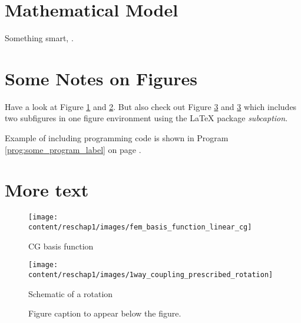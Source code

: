 \section{Mathematical Model}
Something smart, \cite{Gorman2006phd}.

\section{Some Notes on Figures}
Have a look at Figure \ref{fig:basis_fun_cg} and \ref{fig:rotation_schematic}. But also check out Figure \ref{fig:basis_functions} and \ref{fig:basis_functions} which includes two subfigures in one figure environment using the \LaTeX{} package \textsl{subcaption}.

Example of including programming code is shown in Program \ref{prog:some_program_label} on page \pageref{prog:some_program_label}.

\section{More text}
\blindtext

\begin{figure}[p]
 \centering
 \texttt{[image: content/reschap1/images/fem\_basis\_function\_linear\_cg]}
 \caption[Basis function]{CG basis function}
 \label{fig:basis_fun_cg}
\end{figure}

\begin{figure}[p]
 \centering
 \texttt{[image: content/reschap1/images/1way\_coupling\_prescribed\_rotation]}
 \caption[Schematic]{Schematic of a rotation}
 \label{fig:rotation_schematic}
\end{figure}

\begin{figure}[p!]
 \centering
 \captionsetup[sub]{skip=0ex}
 \hfill
%
 \caption[Figure caption to appear in \textsl{List of Figures}]{Figure caption to appear below the figure.}
 \label{fig:basis_functions}
\end{figure}

\clearpage
\begin{program}[p]

\end{program}
